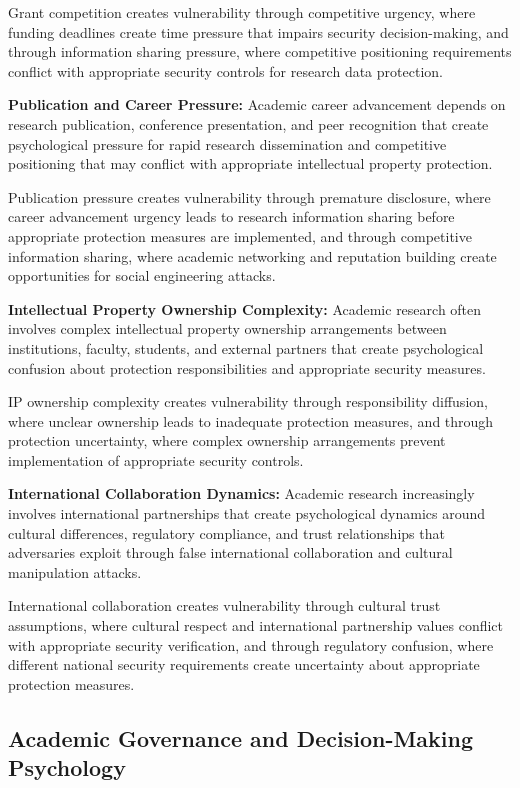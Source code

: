 \documentclass[10pt, twocolumn]{article}
\begin{document}
Grant competition creates vulnerability through competitive urgency, where funding deadlines create time pressure that impairs security decision-making, and through information sharing pressure, where competitive positioning requirements conflict with appropriate security controls for research data protection.

\textbf{Publication and Career Pressure:} Academic career advancement depends on research publication, conference presentation, and peer recognition that create psychological pressure for rapid research dissemination and competitive positioning that may conflict with appropriate intellectual property protection.

Publication pressure creates vulnerability through premature disclosure, where career advancement urgency leads to research information sharing before appropriate protection measures are implemented, and through competitive information sharing, where academic networking and reputation building create opportunities for social engineering attacks.

\textbf{Intellectual Property Ownership Complexity:} Academic research often involves complex intellectual property ownership arrangements between institutions, faculty, students, and external partners that create psychological confusion about protection responsibilities and appropriate security measures.

IP ownership complexity creates vulnerability through responsibility diffusion, where unclear ownership leads to inadequate protection measures, and through protection uncertainty, where complex ownership arrangements prevent implementation of appropriate security controls.

\textbf{International Collaboration Dynamics:} Academic research increasingly involves international partnerships that create psychological dynamics around cultural differences, regulatory compliance, and trust relationships that adversaries exploit through false international collaboration and cultural manipulation attacks.

International collaboration creates vulnerability through cultural trust assumptions, where cultural respect and international partnership values conflict with appropriate security verification, and through regulatory confusion, where different national security requirements create uncertainty about appropriate protection measures.

\subsection{Academic Governance and Decision-Making Psychology}
\end{document}
